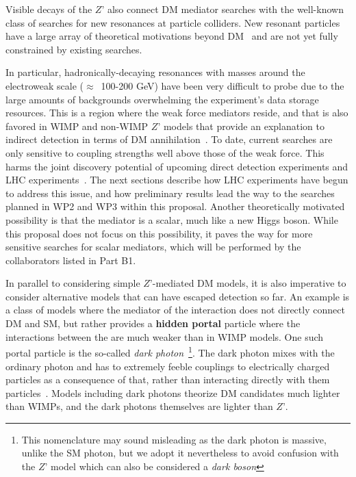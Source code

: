 Visible decays of the  $Z’$ also connect DM mediator searches with the well-known class of searches for new resonances at particle colliders. New resonant particles have a large array of theoretical motivations beyond DM~\cite{Craig2bodyResonances} and are not yet fully constrained by existing searches. 

In particular, hadronically-decaying resonances with masses around the electroweak scale ($\approx$~100-200 GeV) have been very difficult to probe  due to the large amounts of backgrounds overwhelming the experiment’s data storage resources. This is a region where the weak force mediators reside, and that is also favored in WIMP and non-WIMP $Z’$ models that provide an explanation to indirect detection in terms of DM annihilation~\cite{HooperLeane}.  
To date, current searches are only sensitive to coupling strengths well above those of the weak force. This harms the joint discovery potential of upcoming direct detection experiments and LHC experiments~\cite{AnomalyFree}. The next sections describe how LHC experiments have begun to address this issue, and how preliminary results lead the way to the searches planned in WP2 and WP3 within this proposal. Another theoretically motivated possibility is that the mediator is a scalar, much like a new Higgs boson. While this proposal does not focus on this possibility, it paves the way for more sensitive searches for scalar mediators, which will be performed by the collaborators listed in Part B1.  

In parallel to considering simple $Z’$-mediated DM models, it is also imperative to consider alternative models that can have escaped detection so far. An example is a class of models where the mediator of the interaction does not directly connect DM and SM, but rather provides a \textbf{hidden portal} particle where the interactions between the are much weaker than in WIMP models.  One such portal particle is the so-called \textit{dark photon}~\footnote{This nomenclature may sound misleading as the dark photon is massive, unlike the SM photon, but we adopt it nevertheless to avoid confusion with the $Z’$ model which can also be considered a \textit{dark boson}}. The dark photon mixes with the ordinary photon and has to extremely feeble couplings to electrically charged particles as a consequence of that, rather than interacting directly with them particles~\cite{Holden,Curtin}. Models including dark photons theorize DM candidates much lighter than WIMPs, and the dark photons themselves are lighter than $Z’$. 

